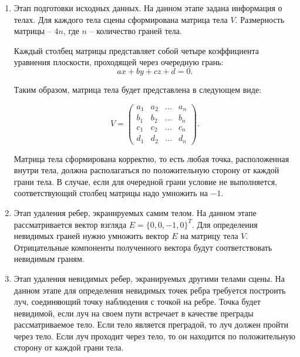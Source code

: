 \begin{enumerate}[label=\arabic*)]
	\item Этап подготовки исходных данных.
	На данном этапе задана информация о телах. Для каждого тела сцены сформирована матрица тела $V$. Размерность матрицы -- $4n$, где $n$ -- количество граней тела.
	
	Каждый столбец матрицы представляет собой четыре коэффициента уравнения плоскости, проходящей через очередную грань:
	\begin{equation}
		\label{eqpolygone}
		ax + by + cz + d = 0.
	\end{equation}
	
	Таким образом, матрица тела будет представлена в следующем виде:
	
	\begin{equation}
		V = \begin{pmatrix}
			a_{1} & a_{2} & \ldots & a_{n}\\
			b_{1} & b_{2} & \ldots & b_{n}\\
			c_{1} & c_{2} & \ldots & c_{n}\\
			d_{1} & d_{2} & \ldots & d_{n}
		\end{pmatrix}.
	\end{equation}
	
	Матрица тела сформирована корректно, то есть любая точка, расположенная внутри тела, должна располагаться по положительную сторону от каждой грани тела. В случае, если для очередной грани условие не выполняется, соответствующий столбец матрицы надо умножить на $-1$. 
	
	\item Этап удаления ребер, экранируемых самим телом.
	На данном этапе рассматривается вектор взгляда $E = \{0, 0, -1, 0\}^T$.
	Для определения невидимых граней нужно умножить вектор $E$ на матрицу тела $V$. Отрицательные компоненты полученного вектора будут соответствовать невидимым граням.

	\item Этап удаления невидимых ребер, экранируемых другими телами сцены.
	На данном этапе для определения невидимых точек ребра требуется построить луч, соединяющий точку наблюдения с точкой на ребре. Точка будет невидимой, если луч на своем пути встречает в качестве преграды рассматриваемое тело. Если тело является преградой, то луч должен пройти через тело. Если луч проходит через тело, то он находится по положительную сторону от каждой грани тела.
\end{enumerate}


